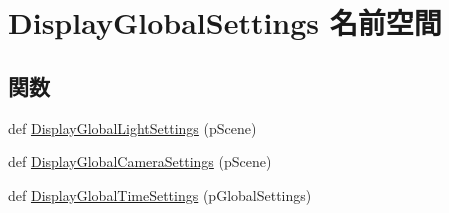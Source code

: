 \hypertarget{namespace_display_global_settings}{}\section{Display\+Global\+Settings 名前空間}
\label{namespace_display_global_settings}
\subsection*{関数}
\begin{DoxyCompactItemize}
\item 
def \hyperlink{namespace_display_global_settings_aed5dc6eed71477fb263de87414837f89}{Display\+Global\+Light\+Settings} (p\+Scene)
\item 
def \hyperlink{namespace_display_global_settings_a07ecbc6845e16da14a7c8298870f3398}{Display\+Global\+Camera\+Settings} (p\+Scene)
\item 
def \hyperlink{namespace_display_global_settings_af586478da702508b3e252312017a1025}{Display\+Global\+Time\+Settings} (p\+Global\+Settings)
\end{DoxyCompactItemize}


